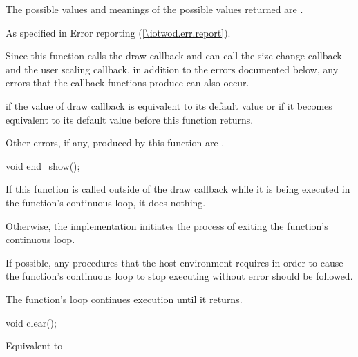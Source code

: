 \begin{itemdescr}
\pnum
\returns
The possible values and meanings of the possible values returned are .

\pnum
\throws
As specified in Error reporting (\ref{\iotwod.err.report}).

\pnum
\remarks
Since this function calls the draw callback and can call the size change callback and the user scaling callback, in addition to the errors documented below, any errors that the callback functions produce can also occur.

\pnum
\errors
{} if the value of draw callback is equivalent to its default value or if it becomes equivalent to its default value before this function returns.

\pnum
Other errors, if any, produced by this function are .
\end{itemdescr}

%
\begin{itemdecl}
void end_show();
\end{itemdecl}
\begin{itemdescr}
\pnum
\effects
If this function is called outside of the draw callback while it is being executed in the  function's continuous loop, it does nothing.

\pnum
Otherwise, the implementation initiates the process of exiting the  function's continuous loop.

\pnum
If possible, any procedures that the host environment requires in order to cause the  function's continuous loop to stop executing without error should be followed.

\pnum
The  function's loop continues execution until it returns.
\end{itemdescr}

%
\begin{itemdecl}
void clear();
\end{itemdecl}
\begin{itemdescr}
\pnum
\effects
Equivalent to 
\end{itemdescr}

